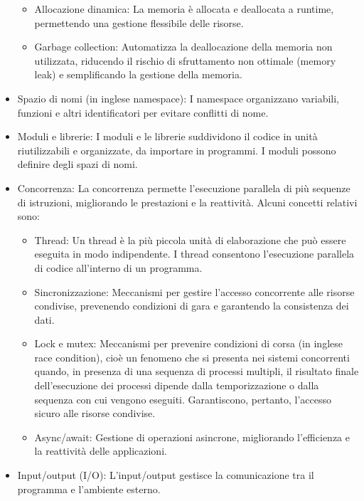 \documentclass[
  letterpaper,
  DIV=11,
  numbers=noendperiod]{scrreprt}
\providecommand{\tightlist}{%
  \setlength{\itemsep}{0pt}\setlength{\parskip}{0pt}}\usepackage{longtable,booktabs,array}
\begin{document}
\begin{itemize}
  \begin{itemize}
  \tightlist
  \item
    Allocazione dinamica: La memoria è allocata e deallocata a runtime,
    permettendo una gestione flessibile delle risorse.
  \item
    Garbage collection: Automatizza la deallocazione della memoria non
    utilizzata, riducendo il rischio di sfruttamento non ottimale
    (memory leak) e semplificando la gestione della memoria.
  \end{itemize}
\item
  Spazio di nomi (in inglese namespace): I namespace organizzano
  variabili, funzioni e altri identificatori per evitare conflitti di
  nome.
\item
  Moduli e librerie: I moduli e le librerie suddividono il codice in
  unità riutilizzabili e organizzate, da importare in programmi. I
  moduli possono definire degli spazi di nomi.
\item
  Concorrenza: La concorrenza permette l'esecuzione parallela di più
  sequenze di istruzioni, migliorando le prestazioni e la reattività.
  Alcuni concetti relativi sono:

  \begin{itemize}
  \tightlist
  \item
    Thread: Un thread è la più piccola unità di elaborazione che può
    essere eseguita in modo indipendente. I thread consentono
    l'esecuzione parallela di codice all'interno di un programma.
  \item
    Sincronizzazione: Meccanismi per gestire l'accesso concorrente alle
    risorse condivise, prevenendo condizioni di gara e garantendo la
    consistenza dei dati.
  \item
    Lock e mutex: Meccanismi per prevenire condizioni di corsa (in
    inglese race condition), cioè un fenomeno che si presenta nei
    sistemi concorrenti quando, in presenza di una sequenza di processi
    multipli, il risultato finale dell'esecuzione dei processi dipende
    dalla temporizzazione o dalla sequenza con cui vengono eseguiti.
    Garantiscono, pertanto, l'accesso sicuro alle risorse condivise.
  \item
    Async/await: Gestione di operazioni asincrone, migliorando
    l'efficienza e la reattività delle applicazioni.
  \end{itemize}
\item
  Input/output (I/O): L'input/output gestisce la comunicazione tra il
  programma e l'ambiente esterno.


\end{itemize}
\end{document}
